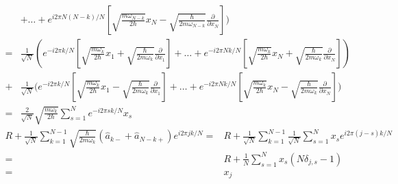 \begin{enumerate}
\begin{align*}
        &+\dots 
        +
        e^{i2\pi N(N-k)/N}
        \left[
        \sqrt{\frac{m\omega_{N-k}}{2\hbar}}x_N
        -
        \sqrt{\frac{\hbar}{2m\omega_{N-k}}}\frac{\partial}{\partial x_N}
        \right]
        \bigg)\\
        =&
        \frac{1}{\sqrt{N}}
        \left(
        e^{-i2\pi k/N}
        \left[
        \sqrt{\frac{m\omega_k}{2\hbar}}x_1
        +
        \sqrt{\frac{\hbar}{2m\omega_k}}\frac{\partial}{\partial x_1}
        \right]
        +\dots 
        +
        e^{-i2\pi Nk/N}
        \left[
        \sqrt{\frac{m\omega_k}{2\hbar}}x_N
        +
        \sqrt{\frac{\hbar}{2m\omega_k}}\frac{\partial}{\partial x_N}
        \right]
        \right)\\
        +&
        \frac{1}{\sqrt{N}}
        \bigg(
        e^{-i2\pi k/N}
        \left[
        \sqrt{\frac{m\omega_{k}}{2\hbar}}x_1
        -
        \sqrt{\frac{\hbar}{2m\omega_{k}}}\frac{\partial}{\partial x_1}
        \right]
        +\dots +
        e^{-i2\pi Nk/N}
        \left[
        \sqrt{\frac{m\omega_k}{2\hbar}}x_N
        -
        \sqrt{\frac{\hbar}{2m\omega_k}}\frac{\partial}{\partial x_N}
        \right]
        \bigg)\\
        =&
        \frac{2}{\sqrt{N}}
        \sqrt{\frac{m\omega_k}{2\hbar}}
        \sum_{s=1}^N
        e^{-i2\pi sk/N}
        x_s
    \end{align*}
    \begin{align*}
    R + \frac{1}{\sqrt{N}}\sum_{k=1}^{N-1}\sqrt{\frac{\hbar}{2 m\omega_k}}(\hat a_{k-}+ \hat a_{N-k+})e^{i2\pi jk/N}
    = & 
    R+ \frac{1}{\sqrt{N}}\sum_{k=1}^{N-1}\frac{1}{\sqrt{N}}
    \sum_{s=1}^Nx_s e^{i2\pi (j-s)k/N}
    \\
    = & R+ \frac{1}{N}\sum_{s=1}^Nx_s (N\delta_{j,s} - 1)\\
    =& x_j
    \end{align*}




\end{enumerate}

